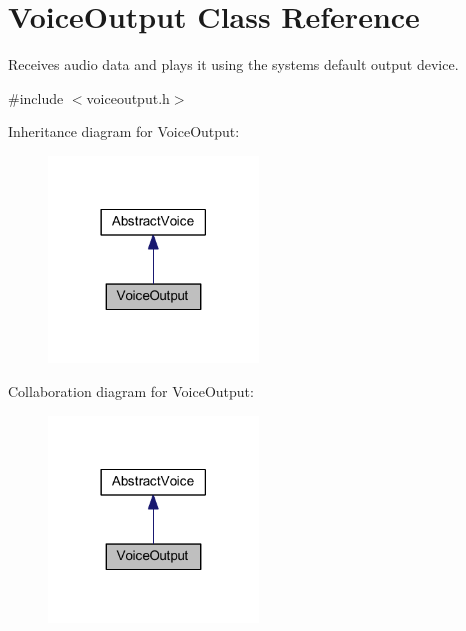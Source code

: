 \hypertarget{class_voice_output}{
\section{\-Voice\-Output \-Class \-Reference}
\label{class_voice_output}
}


\-Receives audio data and plays it using the systems default output device.  




{\ttfamily \#include $<$voiceoutput.\-h$>$}



\-Inheritance diagram for \-Voice\-Output\-:\nopagebreak
\begin{figure}[H]
\begin{center}
\leavevmode
\includegraphics[width=158pt]{class_voice_output__inherit__graph}
\end{center}
\end{figure}


\-Collaboration diagram for \-Voice\-Output\-:\nopagebreak
\begin{figure}[H]
\begin{center}
\leavevmode
\includegraphics[width=158pt]{class_voice_output__coll__graph}
\end{center}
\end{figure}
